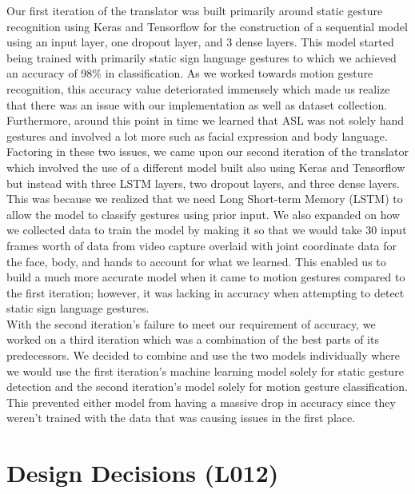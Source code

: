 \documentclass[12pt, titlepage]{article}
\begin{document}
\noindent Our first iteration of the translator was built primarily around static gesture recognition using Keras and Tensorflow for the construction of a sequential model using an input layer, one dropout layer, and 3 dense layers. This model started being trained with primarily static sign language gestures to which we achieved an accuracy of 98\% in classification. As we worked towards motion gesture recognition, this accuracy value deteriorated immensely which made us realize that there was an issue with our implementation as well as dataset collection. Furthermore, around this point in time we learned that ASL was not solely hand gestures and involved a lot more such as facial expression and body language. \\

\noindent Factoring in these two issues, we came upon our second iteration of the translator which involved the use of a different model built also using Keras and Tensorflow but instead with three LSTM layers, two dropout layers, and three dense layers. This was because we realized that we need Long Short-term Memory (LSTM) to allow the model to classify gestures using prior input. We also expanded on how we collected data to train the model by making it so that we would take 30 input frames worth of data from video capture overlaid with joint coordinate data for the face, body, and hands to account for what we learned. This enabled us to build a much more accurate model when it came to motion gestures compared to the first iteration; however, it was lacking in accuracy when attempting to detect static sign language gestures.\\

\noindent With the second iteration’s failure to meet our requirement of accuracy, we worked on a third iteration which was a combination of the best parts of its predecessors. We decided to combine and use the two models individually where we would use the first iteration’s machine learning model solely for static gesture detection and the second iteration’s model solely for motion gesture classification. This prevented either model from having a massive drop in accuracy since they weren’t trained with the data that was causing issues in the first place. \\


\section{Design Decisions (L012)}
\end{document}
